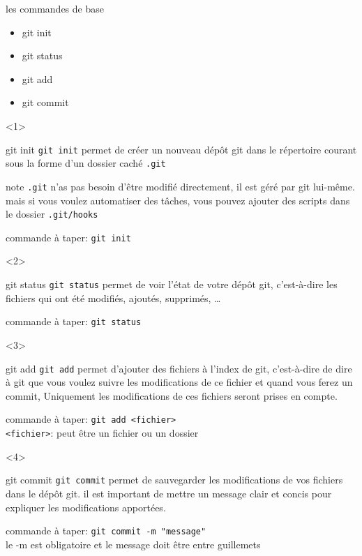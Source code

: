 \documentclass[usenames,dvipsnames]{beamer}
\begin{document}
\begin{frame}[fragile]{les commandes de base}
	\begin{itemize}
		\item<1-4> git init
		\item <2-4> git status
		\item <3-4> git add
		\item <4-4> git commit
	\end{itemize}

	\begin{onlyenv}
		\begin{block}{git init}
			\texttt{git init} permet de créer un nouveau dépôt git dans le répertoire courant sous la forme d'un dossier caché \texttt{.git}
		\end{block}

		\begin{block}{note}
			\texttt{.git} n'as pas besoin d'être modifié directement, il est géré par git lui-même. mais si vous voulez automatiser des tâches, vous pouvez ajouter des scripts dans le dossier \texttt{.git/hooks}
		\end{block}

		commande à taper: \lstinline|git init|
	\end{onlyenv}

	\begin{onlyenv}
		\begin{block}{git status}
			\texttt{git status} permet de voir l'état de votre dépôt git, c'est-à-dire les fichiers qui ont été modifiés, ajoutés, supprimés, \dots
		\end{block}

		commande à taper: \lstinline|git status|
	\end{onlyenv}

	\begin{onlyenv}
		\begin{block}{git add}
			\texttt{git add} permet d'ajouter des fichiers à l'index de git, c'est-à-dire de dire à git que vous voulez suivre les modifications de ce fichier et %
			quand vous ferez un commit, 
			\color{red}
			Uniquement
			\color{black}
			les modifications de ces fichiers seront prises en compte.
		\end{block}

		commande à taper: \lstinline|git add <fichier>| \\
		
		\texttt{<fichier>}: peut être un fichier ou un dossier
	\end{onlyenv}

	\begin{onlyenv}
		\begin{block}{git commit}
			\texttt{git commit} permet de sauvegarder les modifications de vos fichiers dans le dépôt git. il est important de mettre un message clair et concis pour expliquer les modifications apportées.
		\end{block} 

		commande à taper: \lstinline|git commit -m "message"| \\
		le -m est obligatoire et le message doit être entre guillemets
	\end{onlyenv}
\end{frame}
\end{document}
